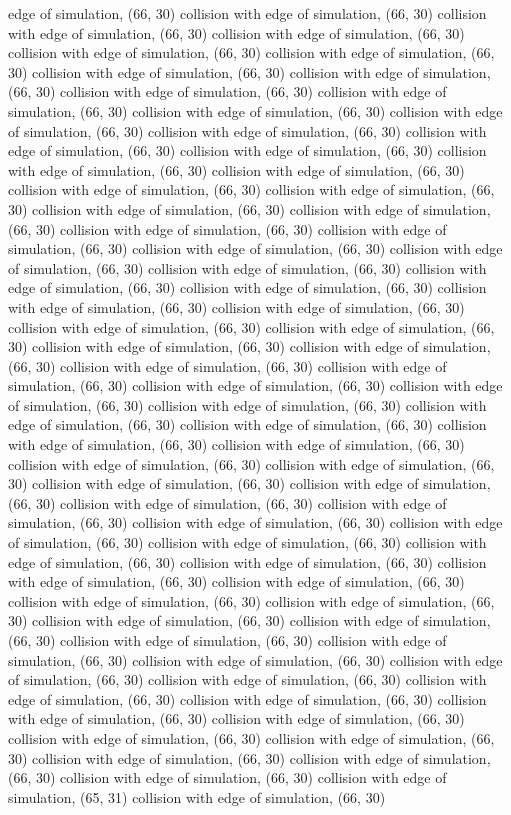 edge of simulation, (66, 30) collision with edge of simulation, (66, 30) collision with edge of simulation, (66, 30) collision with edge of simulation, (66, 30) collision with edge of simulation, (66, 30) collision with edge of simulation, (66, 30) collision with edge of simulation, (66, 30) collision with edge of simulation, (66, 30) collision with edge of simulation, (66, 30) collision with edge of simulation, (66, 30) collision with edge of simulation, (66, 30) collision with edge of simulation, (66, 30) collision with edge of simulation, (66, 30) collision with edge of simulation, (66, 30) collision with edge of simulation, (66, 30) collision with edge of simulation, (66, 30) collision with edge of simulation, (66, 30) collision with edge of simulation, (66, 30) collision with edge of simulation, (66, 30) collision with edge of simulation, (66, 30) collision with edge of simulation, (66, 30) collision with edge of simulation, (66, 30) collision with edge of simulation, (66, 30) collision with edge of simulation, (66, 30) collision with edge of simulation, (66, 30) collision with edge of simulation, (66, 30) collision with edge of simulation, (66, 30) collision with edge of simulation, (66, 30) collision with edge of simulation, (66, 30) collision with edge of simulation, (66, 30) collision with edge of simulation, (66, 30) collision with edge of simulation, (66, 30) collision with edge of simulation, (66, 30) collision with edge of simulation, (66, 30) collision with edge of simulation, (66, 30) collision with edge of simulation, (66, 30) collision with edge of simulation, (66, 30) collision with edge of simulation, (66, 30) collision with edge of simulation, (66, 30) collision with edge of simulation, (66, 30) collision with edge of simulation, (66, 30) collision with edge of simulation, (66, 30) collision with edge of simulation, (66, 30) collision with edge of simulation, (66, 30) collision with edge of simulation, (66, 30) collision with edge of simulation, (66, 30) collision with edge of simulation, (66, 30) collision with edge of simulation, (66, 30) collision with edge of simulation, (66, 30) collision with edge of simulation, (66, 30) collision with edge of simulation, (66, 30) collision with edge of simulation, (66, 30) collision with edge of simulation, (66, 30) collision with edge of simulation, (66, 30) collision with edge of simulation, (66, 30) collision with edge of simulation, (66, 30) collision with edge of simulation, (66, 30) collision with edge of simulation, (66, 30) collision with edge of simulation, (66, 30) collision with edge of simulation, (66, 30) collision with edge of simulation, (66, 30) collision with edge of simulation, (66, 30) collision with edge of simulation, (66, 30) collision with edge of simulation, (66, 30) collision with edge of simulation, (66, 30) collision with edge of simulation, (66, 30) collision with edge of simulation, (66, 30) collision with edge of simulation, (66, 30) collision with edge of simulation, (66, 30) collision with edge of simulation, (66, 30) collision with edge of simulation, (66, 30) collision with edge of simulation, (66, 30) collision with edge of simulation, (66, 30) collision with edge of simulation, (66, 30) collision with edge of simulation, (65, 31) collision with edge of simulation, (66, 30) 